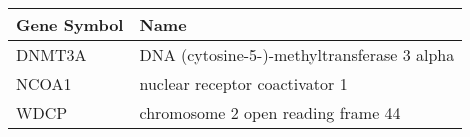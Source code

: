 \begin{tabular}{ll}
\toprule
Gene Symbol &                                        Name \\
\midrule
     DNMT3A & DNA (cytosine-5-)-methyltransferase 3 alpha \\
      NCOA1 &              nuclear receptor coactivator 1 \\
       WDCP &          chromosome 2 open reading frame 44 \\
\bottomrule
\end{tabular}
